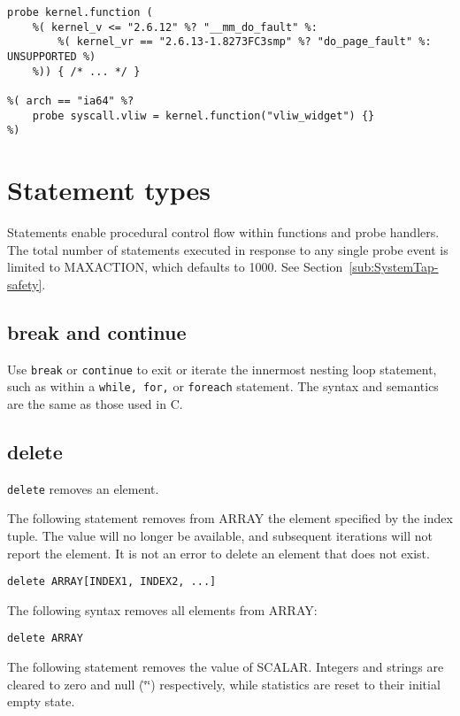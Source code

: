 \documentclass[twoside,english]{article}
\newenvironment{vindent}
{\begin{list}{}{\setlength{\listparindent}{6pt}}
\item[]}
{\end{list}}
\begin{document}
\begin{vindent}
\begin{verbatim}
probe kernel.function (
    %( kernel_v <= "2.6.12" %? "__mm_do_fault" %:
        %( kernel_vr == "2.6.13-1.8273FC3smp" %? "do_page_fault" %: UNSUPPORTED %)
    %)) { /* ... */ }

%( arch == "ia64" %?
    probe syscall.vliw = kernel.function("vliw_widget") {}
%)
\end{verbatim}
\end{vindent}

\section{Statement types\label{sec:Statement-Types}}

Statements enable procedural control flow within functions and probe handlers.
The total number of statements executed in response to any single probe event
is limited to MAXACTION, which defaults to 1000. See Section~\ref{sub:SystemTap-safety}.


\subsection{break and continue}
Use \texttt{break} or \texttt{continue} to exit or iterate the innermost
nesting loop statement, such as within a \texttt{while, for,} or \texttt{foreach}
statement. The syntax and semantics are the same as those used in C.


\subsection{delete}
\texttt{delete} removes an element.

The following statement removes from ARRAY the element specified by the index
tuple. The value will no longer be available, and subsequent iterations will
not report the element. It is not an error to delete an element that does
not exist.

\begin{vindent}
\begin{verbatim}
delete ARRAY[INDEX1, INDEX2, ...]
\end{verbatim}
\end{vindent}
The following syntax removes all elements from ARRAY:

\begin{vindent}
\begin{verbatim}
delete ARRAY
\end{verbatim}
\end{vindent}
The following statement removes the value of SCALAR. Integers and strings
are cleared to zero and null (\char`\"{}\char`\"{}) respectively, while statistics
are reset to their initial empty state.
\end{document}
